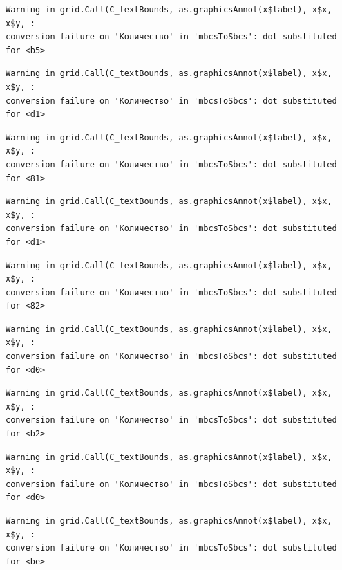 \documentclass[
  letterpaper,
  DIV=11,
  numbers=noendperiod]{scrreprt}
\theoremstyle{definition}
\theoremstyle{remark}
\begin{document}
\begin{verbatim}
Warning in grid.Call(C_textBounds, as.graphicsAnnot(x$label), x$x, x$y, :
conversion failure on 'Количество' in 'mbcsToSbcs': dot substituted for <b5>
\end{verbatim}

\begin{verbatim}
Warning in grid.Call(C_textBounds, as.graphicsAnnot(x$label), x$x, x$y, :
conversion failure on 'Количество' in 'mbcsToSbcs': dot substituted for <d1>
\end{verbatim}

\begin{verbatim}
Warning in grid.Call(C_textBounds, as.graphicsAnnot(x$label), x$x, x$y, :
conversion failure on 'Количество' in 'mbcsToSbcs': dot substituted for <81>
\end{verbatim}

\begin{verbatim}
Warning in grid.Call(C_textBounds, as.graphicsAnnot(x$label), x$x, x$y, :
conversion failure on 'Количество' in 'mbcsToSbcs': dot substituted for <d1>
\end{verbatim}

\begin{verbatim}
Warning in grid.Call(C_textBounds, as.graphicsAnnot(x$label), x$x, x$y, :
conversion failure on 'Количество' in 'mbcsToSbcs': dot substituted for <82>
\end{verbatim}

\begin{verbatim}
Warning in grid.Call(C_textBounds, as.graphicsAnnot(x$label), x$x, x$y, :
conversion failure on 'Количество' in 'mbcsToSbcs': dot substituted for <d0>
\end{verbatim}

\begin{verbatim}
Warning in grid.Call(C_textBounds, as.graphicsAnnot(x$label), x$x, x$y, :
conversion failure on 'Количество' in 'mbcsToSbcs': dot substituted for <b2>
\end{verbatim}

\begin{verbatim}
Warning in grid.Call(C_textBounds, as.graphicsAnnot(x$label), x$x, x$y, :
conversion failure on 'Количество' in 'mbcsToSbcs': dot substituted for <d0>
\end{verbatim}

\begin{verbatim}
Warning in grid.Call(C_textBounds, as.graphicsAnnot(x$label), x$x, x$y, :
conversion failure on 'Количество' in 'mbcsToSbcs': dot substituted for <be>
\end{verbatim}
\end{document}
